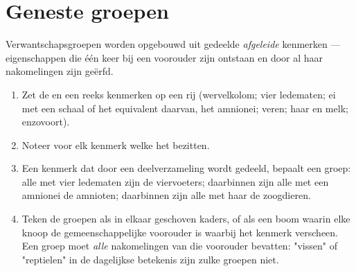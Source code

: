 \section{Geneste groepen}

\begin{method}\label{met:g10:common-ancestry:grouping}
Verwantschapsgroepen worden opgebouwd uit gedeelde \emph{afgeleide}
kenmerken --- eigenschappen die één keer bij een voorouder zijn ontstaan
en door al haar nakomelingen zijn geërfd.
\begin{enumerate}
  \item Zet de  en een reeks kenmerken op een rij (wervelkolom;
        vier ledematen; ei met een schaal of het equivalent daarvan, het
        amnionei; veren; haar en melk; enzovoort).
  \item Noteer voor elk kenmerk welke  het bezitten.
  \item Een kenmerk dat door een deelverzameling wordt gedeeld, bepaalt
        een groep: alle  met vier ledematen zijn de viervoeters;
        daarbinnen zijn alle  met een amnionei de amnioten;
        daarbinnen zijn alle  met haar de zoogdieren.
  \item Teken de groepen als in elkaar geschoven kaders, of als een boom
        waarin elke knoop de gemeenschappelijke voorouder is waarbij het
        kenmerk verscheen. Een groep moet \emph{alle} nakomelingen van
        die voorouder bevatten: "vissen" of "reptielen" in de dagelijkse
        betekenis zijn zulke groepen niet.
\end{enumerate}
\end{method}

